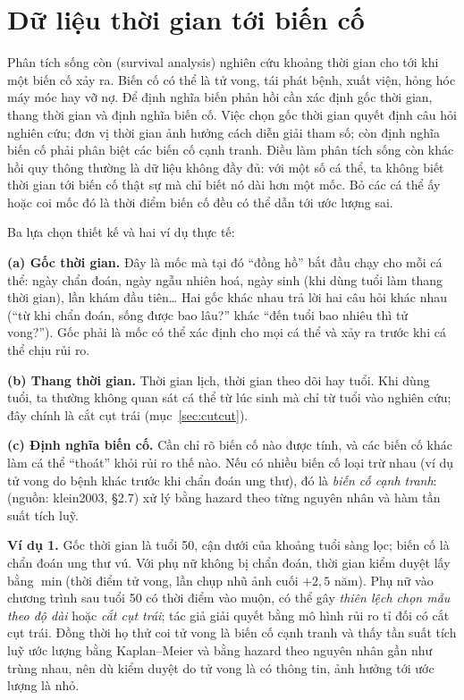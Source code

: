 \documentclass[11pt,a4paper,notitlepage]{report}
\providecommand{\nguon}[1]{(nguồn: #1)}
\begin{document}
\section{Dữ liệu thời gian tới biến cố}

Phân tích sống còn (survival analysis) nghiên cứu khoảng thời gian cho tới khi một biến cố xảy ra.
Biến cố có thể là tử vong, tái phát bệnh, xuất viện, hỏng hóc máy móc hay vỡ nợ. Để định nghĩa
biến phản hồi cần xác định gốc thời gian, thang thời gian và định nghĩa biến cố. Việc chọn gốc
thời gian quyết định câu hỏi nghiên cứu; đơn vị thời gian ảnh hưởng cách diễn giải tham số; còn
định nghĩa biến cố phải phân biệt các biến cố cạnh tranh.
Điều làm phân tích sống còn khác hồi quy thông thường là dữ liệu không đầy đủ: với một số cá
thể, ta không biết thời gian tới biến cố thật sự mà chỉ biết nó dài hơn một mốc. Bỏ các cá thể ấy
hoặc coi mốc đó là thời điểm biến cố đều có thể dẫn tới ước lượng sai.

Ba lựa chọn thiết kế và hai ví dụ thực tế:

\textbf{(a) Gốc thời gian.} Đây là mốc mà tại đó ``đồng hồ'' bắt đầu chạy cho mỗi cá thể: ngày chẩn đoán, ngày ngẫu nhiên hoá,
ngày sinh (khi dùng tuổi làm thang thời gian), lần khám đầu tiên\ldots{} Hai gốc khác nhau trả lời hai câu hỏi khác nhau
(``từ khi chẩn đoán, sống được bao lâu?'' khác ``đến tuổi bao nhiêu thì tử vong?'').
Gốc phải là mốc có thể xác định cho mọi cá thể và xảy ra trước khi cá thể chịu rủi ro.

\textbf{(b) Thang thời gian.} Thời gian lịch, thời gian theo dõi hay tuổi. Khi dùng tuổi, ta thường không quan sát cá thể từ lúc sinh mà chỉ từ tuổi
vào nghiên cứu; đây chính là cắt cụt trái (mục~\ref{sec:cutcut}).

\textbf{(c) Định nghĩa biến cố.} Cần chỉ rõ biến cố nào được tính, và các biến cố khác làm cá thể ``thoát'' khỏi rủi ro thế nào.
Nếu có nhiều biến cố loại trừ nhau (ví dụ tử vong do bệnh khác trước khi chẩn đoán ung thư), đó là \emph{biến cố cạnh tranh}:
\nguon{klein2003, \S2.7} xử lý bằng hazard theo từng nguyên nhân và hàm tần suất tích luỹ.

\medskip
\textbf{Ví dụ 1.} Gốc thời gian là tuổi 50, cận dưới của khoảng tuổi sàng lọc; biến cố là chẩn đoán ung thư vú.
Với phụ nữ không bị chẩn đoán, thời gian kiểm duyệt lấy bằng $\min$(thời điểm tử vong, lần chụp nhũ ảnh cuối $+2{,}5$ năm).
Phụ nữ vào chương trình sau tuổi 50 có thời điểm vào muộn, có thể gây \emph{thiên lệch chọn mẫu theo độ dài} hoặc \emph{cắt cụt trái};
tác giả giải quyết bằng mô hình rủi ro tỉ đối có cắt cụt trái. Đồng thời họ thử coi tử vong là biến cố cạnh tranh và thấy
tần suất tích luỹ ước lượng bằng Kaplan--Meier và bằng hazard theo nguyên nhân gần như trùng nhau, nên dù kiểm duyệt do tử vong
là có thông tin, ảnh hưởng tới ước lượng là nhỏ. \cite{armero2016}
\end{document}
